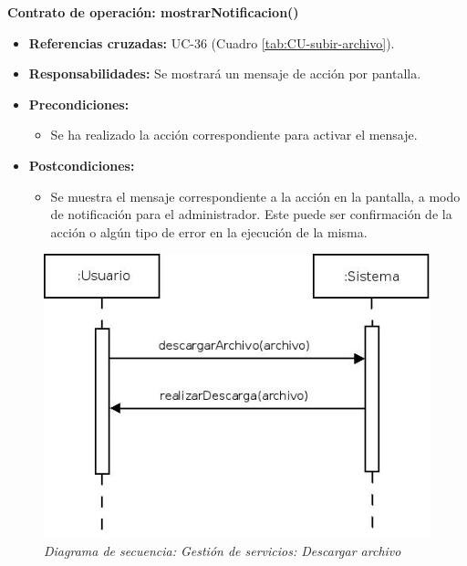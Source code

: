 \textbf{Contrato de operación: mostrarNotificacion()}
\begin{itemize}
\item \textbf{Referencias cruzadas:} UC-36 (Cuadro \ref{tab:CU-subir-archivo}).
\item \textbf{Responsabilidades:} Se mostrará un mensaje de acción por pantalla.
\item \textbf{Precondiciones:} 
 \begin{itemize}
\item Se ha realizado la acción correspondiente para activar el mensaje.
\end {itemize}
\item \textbf{Postcondiciones:} 
 \begin{itemize}
\item Se muestra el mensaje correspondiente a la acción en la pantalla, a modo de notificación para el administrador. Este puede ser confirmación de la acción o algún tipo de error en la ejecución de la misma.
\end {itemize}
\end {itemize}


\vspace{10mm}

\begin{figure}
\centering
  \includegraphics[scale=.55]{img/secuencias/gestion-servicios-descargar-archivo.jpeg}
  \caption{\textit{Diagrama de secuencia: Gestión de servicios: Descargar archivo}}
  \label{fig:secuencia-gestion-servicios-descargar-archivo}
\end{figure}

